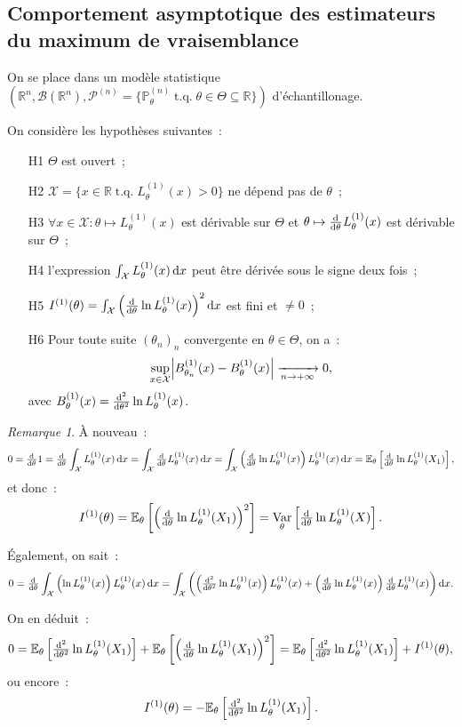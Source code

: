 \documentclass{report}
\DeclareMathOperator{\tq}{\text{ t.q. }}
\DeclareMathOperator{\Var}{Var}
\renewcommand{\P}{\mathbb P}
\newcommand{\E}{\mathbb E}
\newcommand{\pinfty}{{+\infty}}
\newcommand{\R}{\mathbb R}
\newcommand{\Brl}{\mathcal B}  %
\newcommand{\n}{{(n)}}
\theoremstyle{definition}
\theoremstyle{remark}
\newtheorem*{rmq}{Remarque}
\begin{document}
		\subsection{Comportement asymptotique des estimateurs du maximum de vraisemblance}
			On se place dans un modèle statistique $(\R^n, \Brl(\R^n), \mathcal P^\n = \{\P_\theta^\n \tq \theta \in \Theta \subseteq \R\})$ d'échantillonage.

			On considère les hypothèses suivantes~:
			\begin{itemize}
				\item[H1] $\Theta$ est ouvert~;
				\item[H2] $\mathcal X = \{x \in \R \tq L_\theta^{(1)}(x) > 0\}$ ne dépend pas de $\theta$~;
				\item[H3] $\forall x \in \mathcal X : \theta \mapsto L_\theta^{(1)}(x)$ est dérivable sur $\Theta$ et $\theta \mapsto \od {}\theta L_\theta^{(1)}(x)$ est
				dérivable sur $\Theta$~;
				\item[H4] l'expression $\int_{\mathcal X}L_\theta^{(1)}(x)\dif x$ peut être dérivée sous le signe deux fois~;
				\item[H5] $I^{(1)}(\theta) = \int_{\mathcal X}\left(\od {}\theta\ln L_\theta^{(1)}(x)\right)^2\dif x$ est fini et $\neq 0$~;
				\item[H6] Pour toute suite $(\theta_n)_n$ convergente en $\theta \in \Theta$, on a~:
				\[\sup_{x \in \mathcal X}\abs {B_{\theta_n}^{(1)}(x) - B_\theta^{(1)}(x)} \xrightarrow[n \to \pinfty]{} 0,\]
				avec $B_\theta^{(1)}(x) = \od[2]{}\theta \ln L_\theta^{(1)}(x)$.
			\end{itemize}

			\begin{rmq} À nouveau~:
			\[0 = \od {}\theta 1 = \od {}\theta\int_{\mathcal X}L_\theta^{(1)}(x)\dif x = \int_{\mathcal X}\od {}\theta L_\theta^{(1)}(x)\dif x
				= \int_{\mathcal X}\left(\od {}\theta \ln L_\theta^{(1)}(x)\right)L_\theta^{(1)}(x)\dif x = \E_\theta\left[\od {}\theta\ln L_\theta^{(1)}(X_1)\right],\]
			et donc~:
			\[I^{(1)}(\theta) = \E_\theta\left[\left(\od {}\theta \ln L_\theta^{(1)}(X_1)\right)^2\right] = \Var_\theta\left[\od {}\theta \ln L_\theta^{(1)}(X)\right].\]

			Également, on sait~:
			\[0 = \od {}\theta \int_{\mathcal X}\left(\ln L_\theta^{(1)}(x)\right)L_\theta^{(1)}(x)\dif x
				= \int_{\mathcal X}\left(\left(\od[2]{}\theta\ln L_\theta^{(1)}(x)\right)L_\theta^{(1)}(x)
					+ \left(\od {}\theta\ln L_\theta^{(1)}(x)\right)\od {}\theta L_\theta^{(1)}(x)\right)\dif x.\]

			On en déduit~:
			\[0 = \E_\theta\left[\od[2] {}\theta \ln L_\theta^{(1)}(X_1)\right] + \E_\theta\left[\left(\od {}\theta \ln L_\theta^{(1)}(X_1)\right)^2\right]
				= \E_\theta\left[\od[2] {}\theta \ln L_\theta^{(1)}(X_1)\right] + I^{(1)}(\theta),\]
			ou encore~:
			\[I^{(1)}(\theta) = -\E_\theta\left[\od[2] {}\theta \ln L_\theta^{(1)}(X_1)\right].\]
			\end{rmq}
\end{document}
